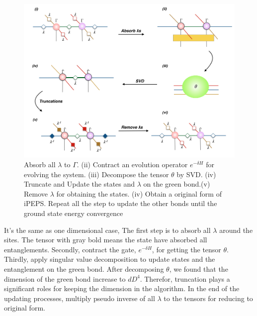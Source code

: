 \begin{figure}[ht]
	\centering
	\includegraphics[width=1.00\textwidth]{figures/fig315.png}
	\caption[The tensor network diagrams of updating the green bond in iPEPS with 2D-iTEBD]{Absorb all $\lambda$ to $\Gamma$. (ii) Contract an evolution operator $e^{-\delta H}$ for evolving the system. (iii) Decompose the tensor $\theta$ by SVD. (iv) Truncate and Update the states and $\lambda$ on the green bond.(v) Remove $\lambda$ for obtaining the states. (iv) Obtain a original form of iPEPS. Repeat all the step to update the other bonds until the ground state energy convergence}
	\label{fig315}
\end{figure}

It's the same as one dimensional case, The first step is to absorb all $\lambda$ around the sites. The tensor with gray bold means the state have absorbed all entanglements. Secondly, contract the gate, $e^{-\delta H}$, for getting the tensor $\theta$. Thirdly, apply singular value decomposition to update states and the entanglement on the green bond. After decomposing $\theta$, we found that the dimension of the green bond increase to $dD^4$. Therefor, truncation plays a significant roles for keeping the dimension in the algorithm. In the end of the updating processes, multiply pseudo inverse of all $\lambda$ to the tensors for reducing to original form. 

